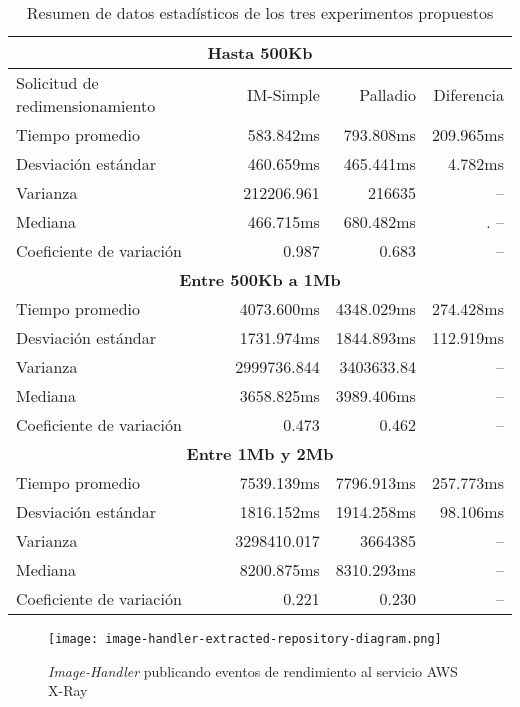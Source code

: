 \hspace{-4cm}
\begin{table}
    \centering
    \begin{tabular}{l|r|r|r}
        \toprule[1.5pt]
        \multicolumn{4}{c}{\textbf{Hasta 500Kb}} \\
        \midrule
        Solicitud de redimensionamiento  & IM-Simple & Palladio & Diferencia\\
        \midrule
        Tiempo promedio  & 583.842ms & 793.808ms & 209.965ms\\
        Desviación estándar & 460.659ms & 465.441ms & 4.782ms\\
        Varianza & 212206.961 & 216635 & -- \\
        Mediana & 466.715ms & 680.482ms &. -- \\
        Coeficiente de variación & 0.987 & 0.683 & -- \\
        \toprule[1.5pt]
         \multicolumn{4}{c}{\textbf{Entre 500Kb a 1Mb}} \\
         \midrule 
        Tiempo promedio  & 4073.600ms & 4348.029ms & 274.428ms\\
        Desviación estándar & 1731.974ms & 1844.893ms & 112.919ms\\
        Varianza & 2999736.844 & 3403633.84 & --\\
        Mediana & 3658.825ms & 3989.406ms & -- \\
        Coeficiente de variación & 0.473 & 0.462 & -- \\
        \toprule[1.5pt]
         \multicolumn{4}{c}{\textbf{Entre 1Mb y 2Mb}} \\
         \midrule 
        Tiempo promedio  & 7539.139ms & 7796.913ms & 257.773ms\\
        Desviación estándar & 1816.152ms & 1914.258ms & 98.106ms \\
        Varianza & 3298410.017 & 3664385 & -- \\
        Mediana & 8200.875ms & 8310.293ms & -- \\
        Coeficiente de variación & 0.221 & 0.230 & -- \\                        
        \bottomrule[1.5pt]
    \end{tabular}
    \caption{Resumen de datos estadísticos de los tres experimentos propuestos}
    \label{table:resumen-estadistico-general}
\end{table}

\begin{landscape}
\begin{figure}[h]
  \vspace*{-3cm}  
  \centering
  \texttt{[image: image-handler-extracted-repository-diagram.png]}
  \caption{\emph{Image-Handler} publicando eventos de rendimiento al servicio AWS X-Ray}
  \label{fig:image-handler-pcm-model}
\end{figure}
\end{landscape}

